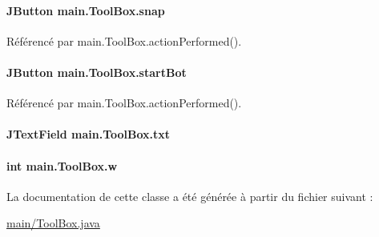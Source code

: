 \paragraph[{snap}]{\setlength{\rightskip}{0pt plus 5cm}J\+Button main.\+Tool\+Box.\+snap\hspace{0.3cm}{\ttfamily [private]}}\label{classmain_1_1ToolBox_ab4249615a8635a1ba3790c3127cc54e4}


Référencé par main.\+Tool\+Box.\+action\+Performed().

\hypertarget{classmain_1_1ToolBox_a248a61ebb2d33e7ac7f7929345d65d93}{}
\paragraph[{start\+Bot}]{\setlength{\rightskip}{0pt plus 5cm}J\+Button main.\+Tool\+Box.\+start\+Bot\hspace{0.3cm}{\ttfamily [private]}}\label{classmain_1_1ToolBox_a248a61ebb2d33e7ac7f7929345d65d93}


Référencé par main.\+Tool\+Box.\+action\+Performed().

\hypertarget{classmain_1_1ToolBox_a70a0516fb7bc406c12be2414b5bbb569}{}
\paragraph[{txt}]{\setlength{\rightskip}{0pt plus 5cm}J\+Text\+Field main.\+Tool\+Box.\+txt\hspace{0.3cm}{\ttfamily [private]}}\label{classmain_1_1ToolBox_a70a0516fb7bc406c12be2414b5bbb569}
\hypertarget{classmain_1_1ToolBox_a2974cabc3f1e5d463de8b96c1a6451fa}{}
\paragraph[{w}]{\setlength{\rightskip}{0pt plus 5cm}int main.\+Tool\+Box.\+w\hspace{0.3cm}{\ttfamily [private]}}\label{classmain_1_1ToolBox_a2974cabc3f1e5d463de8b96c1a6451fa}


La documentation de cette classe a été générée à partir du fichier suivant \+:\begin{DoxyCompactItemize}
\item 
\hyperlink{main_2ToolBox_8java}{main/\+Tool\+Box.\+java}\end{DoxyCompactItemize}
